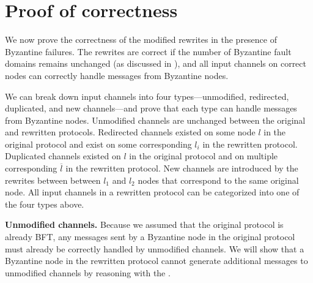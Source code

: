 \section{Proof of correctness}
\label{sec:proofs}
We now prove the correctness of the modified rewrites in the presence of Byzantine failures.
The rewrites are correct if the number of Byzantine fault domains remains unchanged (as discussed in ), 
and all input channels on correct nodes can correctly handle messages from Byzantine nodes. 


We can break down input channels into four types---unmodified, redirected, duplicated, and new channels---and prove that each type can handle messages from Byzantine nodes.
Unmodified channels are unchanged between the original and rewritten protocols.
Redirected channels existed on some node $l$ in the original protocol and exist on some corresponding $l_i$ in the rewritten protocol.
Duplicated channels existed on $l$ in the original protocol and on multiple corresponding $\overline{l}$ in the rewritten protocol.
New channels are introduced by the rewrites between between $l_1$ and $l_2$ nodes that correspond to the same original node.
All input channels in a rewritten protocol can be categorized into one of the four types above.

\textbf{Unmodified channels.}
Because we assumed that the original protocol is already BFT, any messages sent by a Byzantine node in the original protocol must already be correctly handled by unmodified channels.
We will show that a Byzantine node in the rewritten protocol cannot generate additional messages to unmodified channels by reasoning with the \randomSimulator{}.

